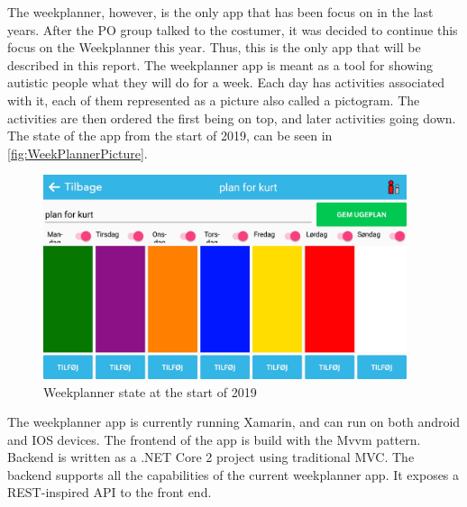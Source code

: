\par \noindent
The weekplanner, however, is the only app that has been focus on in the last years. After the \gls{PO} group talked to the costumer, it was decided to continue this focus on the Weekplanner this year. Thus, this is the only app that will be described in this report.  \newline
The weekplanner app is meant as a tool for showing autistic people what they will do for a week. Each day has activities associated with it, each of them represented as a picture also called a pictogram. The activities are then ordered the first being on top, and later activities going down. The state of the app from the start of 2019, can be seen in \autoref{fig:WeekPlannerPicture}.

\begin{figure}[ht]
        \begin{center}
            \includegraphics[width=0.95\textwidth]{figures/WeekPlannerPicture}
        \end{center}
        \caption{Weekplanner state at the start of 2019}
        \label{fig:WeekPlannerPicture}
\end{figure}

\noindent
The weekplanner app is currently running Xamarin, and can run on both android and IOS devices. The frontend of the app is build with the \gls{Mvvm} pattern.
Backend is written as a .NET Core 2 project using traditional MVC. The backend supports all the capabilities of the current weekplanner app. It exposes a REST-inspired API to the front end.
